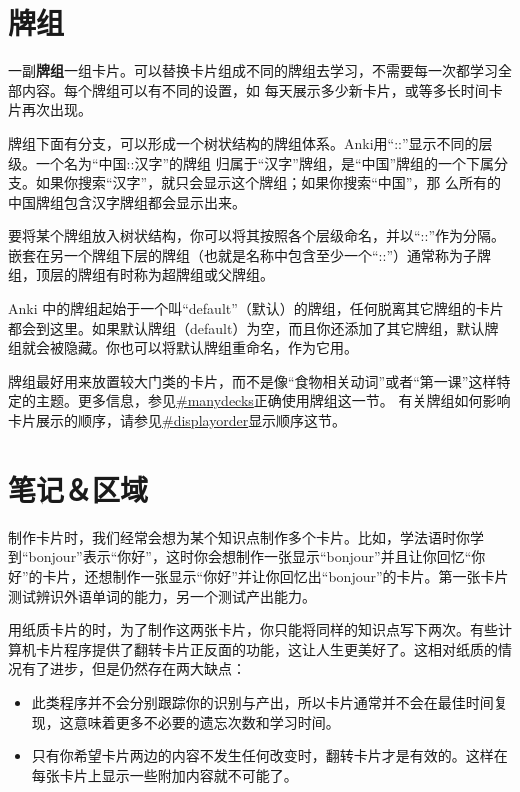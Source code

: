 \documentclass[a4paper]{book}
\begin{document}
\section{牌组}
一副\textbf{牌组}一组卡片。可以替换卡片组成不同的牌组去学习，不需要每一次都学习全部内容。每个牌组可以有不同的设置，如 每天展示多少新卡片，或等多长时间卡片再次出现。

牌组下面有分支，可以形成一个树状结构的牌组体系。Anki用“::”显示不同的层级。一个名为“中国::汉字”的牌组 归属于“汉字”牌组，是“中国”牌组的一个下属分支。如果你搜索“汉字”，就只会显示这个牌组；如果你搜索“中国”，那 么所有的中国牌组包含汉字牌组都会显示出来。

要将某个牌组放入树状结构，你可以将其按照各个层级命名，并以“::”作为分隔。嵌套在另一个牌组下层的牌组（也就是名称中包含至少一个“::”）通常称为子牌组，顶层的牌组有时称为超牌组或父牌组。

Anki 中的牌组起始于一个叫“default”（默认）的牌组，任何脱离其它牌组的卡片都会到这里。如果默认牌组（default）为空，而且你还添加了其它牌组，默认牌组就会被隐藏。你也可以将默认牌组重命名，作为它用。

牌组最好用来放置较大门类的卡片，而不是像“食物相关动词”或者“第一课”这样特定的主题。更多信息，参见\url{#manydecks}正确使用牌组这一节。
有关牌组如何影响卡片展示的顺序，请参见\url{#displayorder}显示顺序这节。

\section{笔记＆区域}

制作卡片时，我们经常会想为某个知识点制作多个卡片。比如，学法语时你学到“bonjour”表示“你好”，这时你会想制作一张显示“bonjour”并且让你回忆“你好”的卡片，还想制作一张显示“你好”并让你回忆出“bonjour”的卡片。第一张卡片测试辨识外语单词的能力，另一个测试产出能力。

用纸质卡片的时，为了制作这两张卡片，你只能将同样的知识点写下两次。有些计算机卡片程序提供了翻转卡片正反面的功能，这让人生更美好了。这相对纸质的情况有了进步，但是仍然存在两大缺点：

\begin{itemize}
	\itemsep1pt\parskip0pt
	\item 此类程序并不会分别跟踪你的识别与产出，所以卡片通常并不会在最佳时间复现，这意味着更多不必要的遗忘次数和学习时间。
	\item 只有你希望卡片两边的内容不发生任何改变时，翻转卡片才是有效的。这样在每张卡片上显示一些附加内容就不可能了。
\end{itemize}
\end{document}
